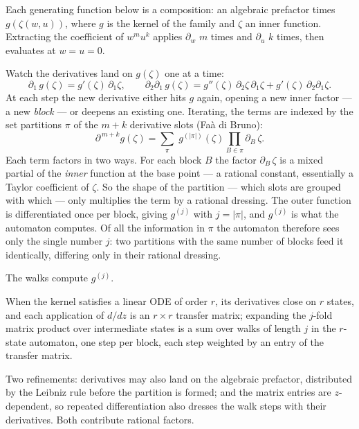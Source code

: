 \documentclass[11pt,a4paper]{article}
\theoremstyle{definition}
\begin{document}
\begin{tcolorbox}[breakable, colback=yellow!10, colframe=yellow!10, boxrule=0pt, sharp corners]

Each generating function below is a composition: an algebraic
prefactor times $g(\zeta(w,u))$, where $g$ is the kernel of the
family and $\zeta$ an inner function. Extracting the coefficient of
$w^m u^k$ applies $\partial_w$ $m$ times and $\partial_u$ $k$ times,
then evaluates at $w = u = 0$.

Watch the derivatives land on $g(\zeta)$ one at a time:
\[
  \partial_1\, g(\zeta) = g'(\zeta)\,\partial_1\zeta, \qquad
  \partial_2 \partial_1\, g(\zeta)
  = g''(\zeta)\,\partial_2\zeta\,\partial_1\zeta
  + g'(\zeta)\,\partial_2\partial_1\zeta .
\]
At each step the new derivative either hits $g$ again, opening a new
inner factor --- a new \emph{block} --- or deepens an existing one.
Iterating, the terms are indexed by the set partitions $\pi$ of the
$m+k$ derivative slots (Fa\`a di Bruno):
\[
  \partial^{\,m+k} g(\zeta)
  = \sum_{\pi}\; g^{(|\pi|)}(\zeta) \prod_{B \in \pi} \partial_B\, \zeta .
\]
Each term factors in two ways. For each block $B$ the factor
$\partial_B\, \zeta$ is a mixed partial of the \emph{inner} function
at the base point --- a rational constant, essentially a Taylor
coefficient of $\zeta$. So the shape of the partition --- which
slots are grouped with which --- only multiplies the term by a
rational dressing. The outer function is differentiated once per
block, giving $g^{(j)}$ with $j = |\pi|$, and $g^{(j)}$ is what the
automaton computes. Of all the information in $\pi$ the automaton
therefore sees only the single number $j$: two partitions with the
same number of blocks feed it identically, differing only in their
rational dressing.

The walks compute $g^{(j)}$.

When the kernel satisfies a linear ODE
of order $r$, its derivatives close on $r$ states, and each
application of $d/dz$ is an $r \times r$ transfer matrix; expanding
the $j$-fold matrix product over intermediate states is a sum over
walks of length $j$ in the $r$-state automaton, one step per block,
each step weighted by an entry of the transfer matrix.

\medskip
Two refinements: derivatives may also land on the algebraic
prefactor, distributed by the Leibniz rule before the partition is
formed; and the matrix entries are $z$-dependent, so
repeated differentiation also dresses the walk steps with their
derivatives. Both contribute rational factors.


\end{tcolorbox}
\end{document}
